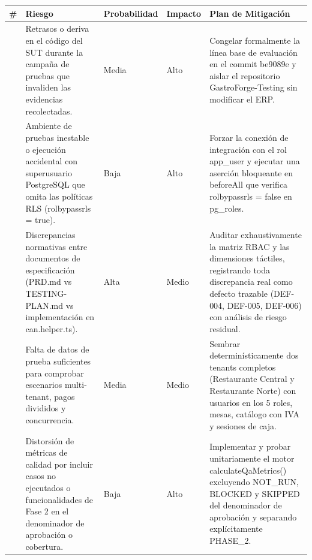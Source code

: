 \documentclass[10pt,a4paper]{article}
\newcounter{none}
\begin{document}
{\def\LTcaptype{none} %
\begin{longtable}[]{@{}
  >{\raggedright\arraybackslash}p{}
  >{\raggedright\arraybackslash}p{}
  >{\raggedright\arraybackslash}p{}
  >{\raggedright\arraybackslash}p{}
  >{\raggedright\arraybackslash}p{}@{}}
\toprule\noalign{}
\begin{minipage}[b]{\linewidth}\raggedright
\#
\end{minipage} & \begin{minipage}[b]{\linewidth}\raggedright
Riesgo
\end{minipage} & \begin{minipage}[b]{\linewidth}\raggedright
Probabilidad
\end{minipage} & \begin{minipage}[b]{\linewidth}\raggedright
Impacto
\end{minipage} & \begin{minipage}[b]{\linewidth}\raggedright
Plan de Mitigación
\end{minipage} \\
\midrule\noalign{}
\endhead
\bottomrule\noalign{}
\endlastfoot
1 & Retrasos o deriva en el código del SUT durante la campaña de pruebas que invaliden las evidencias recolectadas. & Media & Alto & Congelar formalmente la línea base de evaluación en el commit be9089e y aislar el repositorio GastroForge-Testing sin modificar el ERP. \\
2 & Ambiente de pruebas inestable o ejecución accidental con superusuario PostgreSQL que omita las políticas RLS (rolbypassrls = true). & Baja & Alto & Forzar la conexión de integración con el rol app\_user y ejecutar una aserción bloqueante en beforeAll que verifica rolbypassrls = false en pg\_roles. \\
3 & Discrepancias normativas entre documentos de especificación (PRD.md vs TESTING-PLAN.md vs implementación en can.helper.ts). & Alta & Medio & Auditar exhaustivamente la matriz RBAC y las dimensiones táctiles, registrando toda discrepancia real como defecto trazable (DEF-004, DEF-005, DEF-006) con análisis de riesgo residual. \\
4 & Falta de datos de prueba suficientes para comprobar escenarios multi-tenant, pagos divididos y concurrencia. & Media & Medio & Sembrar determinísticamente dos tenants completos (Restaurante Central y Restaurante Norte) con usuarios en los 5 roles, mesas, catálogo con IVA y sesiones de caja. \\
5 & Distorsión de métricas de calidad por incluir casos no ejecutados o funcionalidades de Fase 2 en el denominador de aprobación o cobertura. & Baja & Alto & Implementar y probar unitariamente el motor calculateQaMetrics() excluyendo NOT\_RUN, BLOCKED y SKIPPED del denominador de aprobación y separando explícitamente PHASE\_2. \\
\end{longtable}
}
\end{document}
